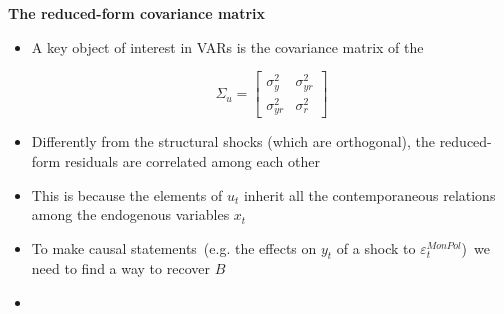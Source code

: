 \documentclass[10pt,english,t,aspectratio=169,ignorenonframetext]{beamer}
\begin{document}
\begin{frame}
{\textbf{The reduced-form covariance matrix}}

\begin{itemize}
\item A key object of interest in VARs is the covariance matrix of the {%
} 
\begin{equation*}
\Sigma _{u}=\left[ 
\begin{array}{cc}
\sigma _{y}^{2} & \sigma _{yr}^{2} \\ 
\sigma _{yr}^{2} & \sigma _{r}^{2}%
\end{array}%
\right]
\end{equation*}
\vspace{-.1cm}

\item Differently from the structural shocks (which are orthogonal), the
reduced-form residuals are correlated among each other\bigskip

\item This is because the elements of $u_{t}$ inherit all the
contemporaneous relations among the endogenous variables $x_{t}$\bigskip

\item To make causal statements\ (e.g. the effects on $y_{t}$ of a shock to $%
\varepsilon _{t}^{MonPol}$)\ we need to find a way to recover $B$\pause %
\bigskip

\item {%
}
\end{itemize}

\end{frame}

\end{document}
